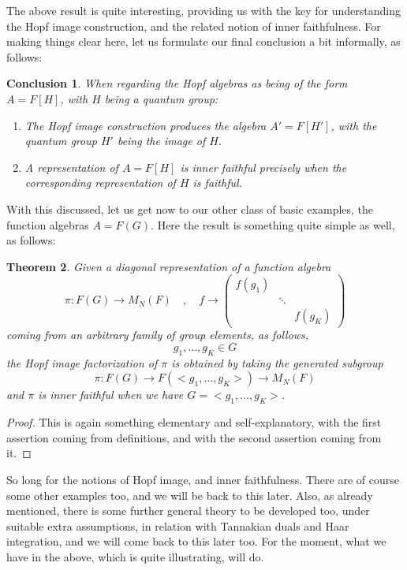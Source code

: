 \documentclass[12pt]{amsbook}
\newtheorem{theorem}{Theorem}[chapter]
\newtheorem{conclusion}[theorem]{Conclusion}
\begin{document}
The above result is quite interesting, providing us with the key for understanding the Hopf image construction, and the related notion of inner faithfulness. For making things clear here, let us formulate our final conclusion a bit informally, as follows:

\begin{conclusion}
When regarding the Hopf algebras as being of the form $A=F[H]$, with $H$ being a quantum group:
\begin{enumerate}
\item The Hopf image construction produces the algebra $A'=F[H']$, with the quantum group $H'$ being the image of $H$. 

\item A representation of $A=F[H]$ is inner faithful precisely when the corresponding representation of $H$ is faithful.
\end{enumerate}
\end{conclusion}

With this discussed, let us get now to our other class of basic examples, the function algebras $A=F(G)$. Here the result is something quite simple as well, as follows:


\begin{theorem}
Given a diagonal representation of a function algebra
$$\pi:F(G)\to M_N(F)\quad,\quad f\to
\begin{pmatrix}
f(g_1)\\
&\ddots\\
&&f(g_K)
\end{pmatrix}$$
coming from an arbitrary family of group elements, as follows,
$$g_1,\ldots,g_K\in G$$
the Hopf image factorization of $\pi$ is obtained by taking the generated subgroup
$$\pi:F(G)\to F(<g_1,\ldots,g_K>)\to M_N(F)$$
and $\pi$ is inner faithful when we have $G=<g_1,\ldots,g_K>$.
\end{theorem}

\begin{proof}
This is again something elementary and self-explanatory, with the first assertion coming from definitions, and with the second assertion coming from it.
\end{proof}

So long for the notions of Hopf image, and inner faithfulness. There are of course some other examples too, and we will be back to this later. Also, as already mentioned, there is some further general theory to be developed too, under suitable extra assumptions, in relation with Tannakian duals and Haar integration, and we will come back to this later too. For the moment, what we have in the above, which is quite illustrating, will do.
\end{document}
